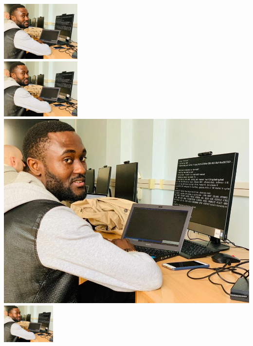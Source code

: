 \documentclass{article}
\begin{document}
\includegraphics[height=3cm]{siriki} \\
\includegraphics[width=0.3\textwidth]{siriki} \\
\includegraphics[scale=0.5]{siriki} \\
\includegraphics[angle=45, width=0.2\textwidth]{siriki}
\end{document}

